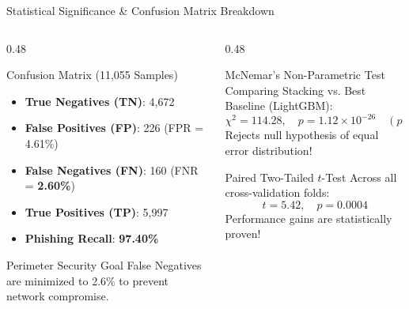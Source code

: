 \documentclass[aspectratio=169,10pt]{beamer}
\begin{document}
\begin{frame}{Statistical Significance \& Confusion Matrix Breakdown}
    \begin{columns}[T]
        \begin{column}{0.48\textwidth}
            \begin{block}{Confusion Matrix (11,055 Samples)}
                \begin{itemize}
                    \item \textbf{True Negatives (TN)}: 4,672
                    \item \textbf{False Positives (FP)}: 226 (FPR = 4.61\%)
                    \item \textbf{False Negatives (FN)}: 160 (FNR = \textbf{2.60\%})
                    \item \textbf{True Positives (TP)}: 5,997
                    \item \textbf{Phishing Recall}: \textbf{97.40\%}
                \end{itemize}
            \end{block}
            \begin{exampleblock}{Perimeter Security Goal}
                False Negatives are minimized to 2.6\% to prevent network compromise.
            \end{exampleblock}
        \end{column}
        
        \begin{column}{0.48\textwidth}
            \begin{alertblock}{McNemar's Non-Parametric Test}
                Comparing Stacking vs. Best Baseline (LightGBM):
                $$\chi^2 = 114.28, \quad p = 1.12 \times 10^{-26} \quad (p < 0.0001)$$
                Rejects null hypothesis of equal error distribution!
            \end{alertblock}
            \begin{block}{Paired Two-Tailed $t$-Test}
                Across all cross-validation folds:
                $$t = 5.42, \quad p = 0.0004$$
                Performance gains are statistically proven!
            \end{block}
        \end{column}
    \end{columns}
\end{frame}
\end{document}
